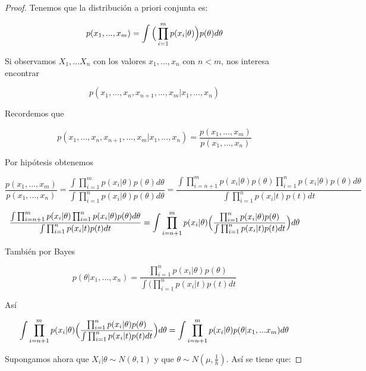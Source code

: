 \documentclass[11pt,letterpaper]{article}
\begin{document}
\begin{proof}

    Tenemos que la distribución a priori conjunta es:

    \[
    p(x_1,...,x_m)=\int\Big{(}\prod_{i=1}^mp(x_i|\theta)\Big{)}p(\theta)d\theta
    \]
    
    Si observamos $X_1,...X_n$ con los valores $x_1,...,x_n$ con $n<m$, nos interesa encontrar

    \[
    p(x_1,...,x_n,x_{n+1},...,x_m|x_1,...,x_n)
    \]

    Recordemos que

    \begin{equation*}
        p(x_1,...,x_n,x_{n+1},...,x_m|x_1,...,x_n)=\frac{p(x_1,...,x_m)}{p(x_1,...,x_n)}
    \end{equation*}

    Por hipótesis obtenemos

    \begin{equation*}
        \frac{p(x_1,...,x_m)}{p(x_1,...,x_n)}=\frac{\int\prod_{i=1}^mp(x_i|\theta)p(\theta)d\theta}{\int\prod_{i=1}^np(x_i|\theta)p(\theta)d\theta}=\frac{\int\prod_{i=n+1}^mp(x_i|\theta)p(\theta)\prod_{i=1}^np(x_i|\theta)p(\theta)d\theta}{\int\prod_{i=1}^np(x_i|t)p(t)dt}
    \end{equation*}

    \begin{equation*}
        \frac{\int\prod_{i=n+1}^mp(x_i|\theta)\prod_{i=1}^np(x_i|\theta)p(\theta)d\theta}{\int\prod_{i=1}^np(x_i|t)p(t)dt}=\int\prod_{i=n+1}^mp(x_i|\theta)\Big{(}\frac{\prod_{i=1}^np(x_i|\theta)p(\theta)}{\int\prod_{i=1}^np(x_i|t)p(t)dt}\Big{)}d\theta
    \end{equation*}

    También por Bayes

    \begin{equation*}
        p(\theta|x_1,...,x_n)=\frac{\prod_{i=1}^np(x_i|\theta)p(\theta)}{\int(\prod_{i=1}^np(x_i|t)p(t)dt}
    \end{equation*}

    Así

    \begin{equation*}       
        \int\prod_{i=n+1}^mp(x_i|\theta)\Big{(}\frac{\prod_{i=1}^np(x_i|\theta)p(\theta)}{\int\prod_{i=1}^np(x_i|t)p(t)dt}\Big{)}d\theta=\int\prod_{i=n+1}^mp(x_i|\theta)p(\theta|x_1,...x_m)d\theta
    \end{equation*}\qedhere

    Supongamos ahora que $X_i|\theta \sim N(\theta,1)$ y que $\theta \sim N(\mu, \frac{1}{h})$. Así se tiene que:


\end{proof}
\end{document}
